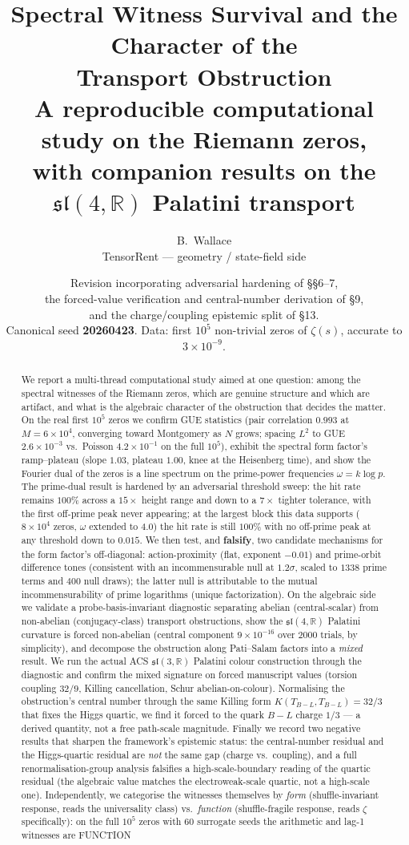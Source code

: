 \documentclass[11pt]{article}
\title{\textbf{Spectral Witness Survival and the Character of the\\ Transport Obstruction}\\[4pt]
\large A reproducible computational study on the Riemann zeros,\\
with companion results on the $\mathfrak{sl}(4,\mathbb{R})$ Palatini transport}
\author{B.~Wallace\\ \small TensorRent --- geometry / state-field side}
\date{\small Revision incorporating adversarial hardening of \S\S6--7,\\
\small the forced-value verification and central-number derivation of \S9,\\
\small and the charge/coupling epistemic split of \S13. \\[2pt]
\small Canonical seed \textbf{20260423}. Data: first $10^5$ non-trivial zeros of $\zeta(s)$, accurate to $3\times10^{-9}$.}
\newcommand{\sltwo}{\mathfrak{sl}(4,\mathbb{R})}
\newcommand{\R}{\mathbb{R}}
\begin{document}
\maketitle
\thispagestyle{fancy}

\begin{abstract}
We report a multi-thread computational study aimed at one question: among the spectral witnesses of the Riemann zeros, which are genuine structure and which are artifact, and what is the algebraic character of the obstruction that decides the matter. On the real first $10^5$ zeros we confirm GUE statistics (pair correlation $0.993$ at $M=6\times10^4$, converging toward Montgomery as $N$ grows; spacing $L^2$ to GUE $2.6\times10^{-3}$ vs.\ Poisson $4.2\times10^{-1}$ on the full $10^5$), exhibit the spectral form factor's ramp--plateau (slope $1.03$, plateau $1.00$, knee at the Heisenberg time), and show the Fourier dual of the zeros is a line spectrum on the prime-power frequencies $\omega=k\log p$. The prime-dual result is hardened by an adversarial threshold sweep: the hit rate remains $100\%$ across a $15\times$ height range and down to a $7\times$ tighter tolerance, with the first off-prime peak never appearing; at the largest block this data supports ($8\times10^4$ zeros, $\omega$ extended to $4.0$) the hit rate is still $100\%$ with no off-prime peak at any threshold down to $0.015$. We then test, and \textbf{falsify}, two candidate mechanisms for the form factor's off-diagonal: action-proximity (flat, exponent $-0.01$) and prime-orbit difference tones (consistent with an incommensurable null at $1.2\sigma$, scaled to $1338$ prime terms and $400$ null draws); the latter null is attributable to the mutual incommensurability of prime logarithms (unique factorization). On the algebraic side we validate a probe-basis-invariant diagnostic separating abelian (central-scalar) from non-abelian (conjugacy-class) transport obstructions, show the $\sltwo$ Palatini curvature is forced non-abelian (central component $9\times10^{-16}$ over $2000$ trials, by simplicity), and decompose the obstruction along Pati--Salam factors into a \emph{mixed} result. We run the actual ACS $\mathfrak{sl}(3,\R)$ Palatini colour construction through the diagnostic and confirm the mixed signature on forced manuscript values (torsion coupling $32/9$, Killing cancellation, Schur abelian-on-colour). Normalising the obstruction's central number through the same Killing form $K(T_{B-L},T_{B-L})=32/3$ that fixes the Higgs quartic, we find it forced to the quark $B\!-\!L$ charge $1/3$ --- a derived quantity, not a free path-scale magnitude. Finally we record two negative results that sharpen the framework's epistemic status: the central-number residual and the Higgs-quartic residual are \emph{not} the same gap (charge vs.\ coupling), and a full renormalisation-group analysis falsifies a high-scale-boundary reading of the quartic residual (the algebraic value matches the electroweak-scale quartic, not a high-scale one). Independently, we categorise the witnesses themselves by \emph{form} (shuffle-invariant response, reads the universality class) vs.\ \emph{function} (shuffle-fragile response, reads $\zeta$ specifically): on the full $10^5$ zeros with $60$ surrogate seeds the arithmetic and lag-1 witnesses are FUNCTION 
\end{abstract}
\end{document}
